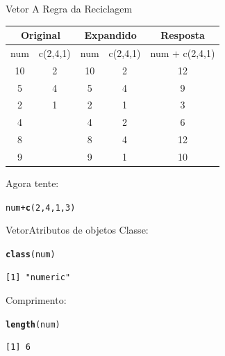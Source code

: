 \documentclass[10pt,handout]{beamer}\usepackage[]{graphicx}\usepackage[]{color}
\makeatletter
\newcommand{\hlnum}[1]{\textcolor[rgb]{0.686,0.059,0.569}{#1}}%
\newcommand{\hlopt}[1]{\textcolor[rgb]{0,0,0}{#1}}%
\newcommand{\hlstd}[1]{\textcolor[rgb]{0.345,0.345,0.345}{#1}}%
\newcommand{\hlkwd}[1]{\textcolor[rgb]{0.737,0.353,0.396}{\textbf{#1}}}%
\newenvironment{kframe}{%
 \def\at@end@of@kframe{}%
 \ifinner\ifhmode%
  \def\at@end@of@kframe{\end{minipage}}%
  \begin{minipage}{\columnwidth}%
 \fi\fi%
 \def\FrameCommand##1{\hskip\@totalleftmargin \hskip-\fboxsep
 \colorbox{shadecolor}{##1}\hskip-\fboxsep
     \hskip-\linewidth \hskip-\@totalleftmargin \hskip\columnwidth}%
 \MakeFramed {\advance\hsize-\width
   \@totalleftmargin\z@ \linewidth\hsize
   \@setminipage}}%
 {\par\unskip\endMakeFramed%
 \at@end@of@kframe}
\newenvironment{knitrout}{}{} %
\makeatother
\begin{document}
\begin{frame}[fragile]{Vetor}
A Regra da Reciclagem
\begin{table}[htbp]
\begin{center}
\begin{tabular}{|c|c|c|c|c|c|}
\hline
\multicolumn{ 2}{|c|}{Original} & \multicolumn{ 2}{c|}{Expandido} & \multicolumn{ 2}{c|}{Resposta} \\ \hline
num & c(2,4,1) & num & c(2,4,1) & \multicolumn{ 2}{c|}{num + c(2,4,1)} \\ \hline
10 & 2 & 10 & 2 & \multicolumn{ 2}{c|}{12} \\ \hline
5 & 4 & 5 & 4 & \multicolumn{ 2}{c|}{9} \\ \hline
2 & 1 & 2 & 1 & \multicolumn{ 2}{c|}{3} \\ \hline
4 &  & 4 & 2 & \multicolumn{ 2}{c|}{6} \\ \hline
8 &  & 8 & 4 & \multicolumn{ 2}{c|}{12} \\ \hline
9 &  & 9 & 1 & \multicolumn{ 2}{c|}{10} \\ \hline
\end{tabular}
\end{center}
\end{table}
Agora tente:
\begin{knitrout}\small
{}\color{fgcolor}\begin{kframe}
\begin{alltt}
\hlstd{num} \hlopt{+} \hlkwd{c}\hlstd{(}\hlnum{2}\hlstd{,} \hlnum{4}\hlstd{,} \hlnum{1}\hlstd{,} \hlnum{3}\hlstd{)}
\end{alltt}
\end{kframe}
\end{knitrout}

\end{frame}

\begin{frame}[fragile]{Vetor}{Atributos de objetos}
Classe:
\begin{knitrout}\small
{}\color{fgcolor}\begin{kframe}
\begin{alltt}
\hlkwd{class}\hlstd{(num)}
\end{alltt}
\begin{verbatim}
[1] "numeric"
\end{verbatim}
\end{kframe}
\end{knitrout}
Comprimento:
\begin{knitrout}\small
{}\color{fgcolor}\begin{kframe}
\begin{alltt}
\hlkwd{length}\hlstd{(num)}
\end{alltt}
\begin{verbatim}
[1] 6
\end{verbatim}
\end{kframe}
\end{knitrout}
\end{frame}
\end{document}
